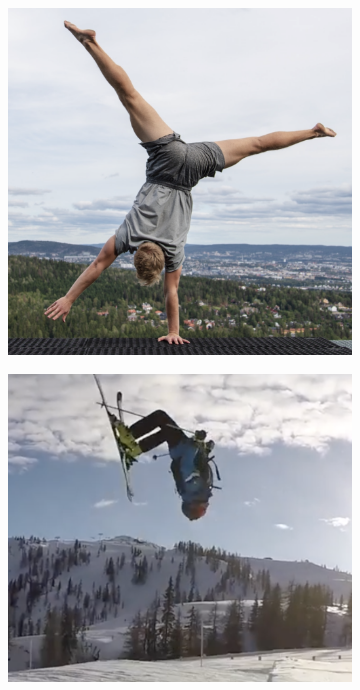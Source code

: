 \documentclass[
	10pt, %
]{beamer}
\begin{document}
\begin{frame}
\begin{columns}
		\begin{minipage}[c][0.5\textheight][c]{\linewidth}
			\begin{figure}
				\centering
				\begin{subfigure}[b]{0.49\linewidth}
					\centering
					\includegraphics[width=0.355\textheight]{figures/handstand.png}
				\end{subfigure}
				\hfill
				\begin{subfigure}[b]{0.49\linewidth}
					\centering
					\includegraphics[width=0.4\textheight]{figures/backflip.png}
				\end{subfigure}
			\end{figure}
		\end{minipage}
			

\end{columns}
\end{frame}
\end{document}
